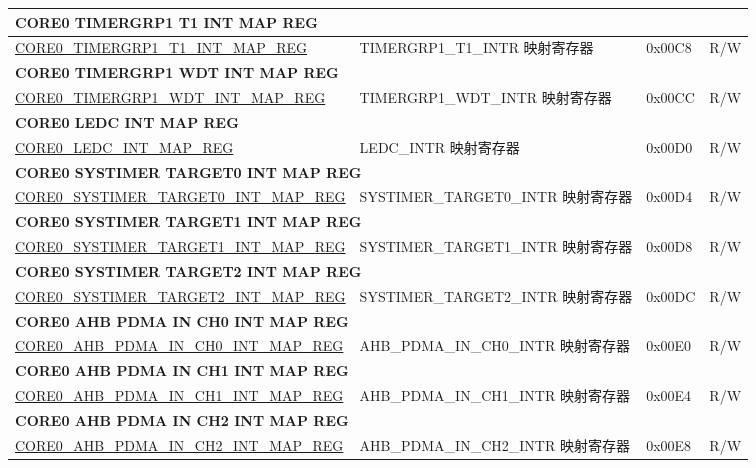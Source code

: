 \begin{longtable}{ | p{8.7cm} | p{6.2cm} | p{1.3cm} | p{1cm} | }
\multicolumn{4}{|l|}{\textbf{CORE0 TIMERGRP1 T1 INT MAP REG}} \\ \hline
\hyperref[regdesc:CORE0TIMERGRP1T1INTMAPREG]{CORE0\_TIMERGRP1\_T1\_INT\_MAP\_REG} & TIMERGRP1\_T1\_INTR 映射寄存器 & 0x00C8 & R/W \\ \hline
\multicolumn{4}{|l|}{\textbf{CORE0 TIMERGRP1 WDT INT MAP REG}} \\ \hline
\hyperref[regdesc:CORE0TIMERGRP1WDTINTMAPREG]{CORE0\_TIMERGRP1\_WDT\_INT\_MAP\_REG} & TIMERGRP1\_WDT\_INTR 映射寄存器 & 0x00CC & R/W \\ \hline
\multicolumn{4}{|l|}{\textbf{CORE0 LEDC INT MAP REG}} \\ \hline
\hyperref[regdesc:CORE0LEDCINTMAPREG]{CORE0\_LEDC\_INT\_MAP\_REG} & LEDC\_INTR 映射寄存器 & 0x00D0 & R/W \\ \hline
\multicolumn{4}{|l|}{\textbf{CORE0 SYSTIMER TARGET0 INT MAP REG}} \\ \hline
\hyperref[regdesc:CORE0SYSTIMERTARGET0INTMAPREG]{CORE0\_SYSTIMER\_TARGET0\_INT\_MAP\_REG} & SYSTIMER\_TARGET0\_INTR 映射寄存器 & 0x00D4 & R/W \\ \hline
\multicolumn{4}{|l|}{\textbf{CORE0 SYSTIMER TARGET1 INT MAP REG}} \\ \hline
\hyperref[regdesc:CORE0SYSTIMERTARGET1INTMAPREG]{CORE0\_SYSTIMER\_TARGET1\_INT\_MAP\_REG} & SYSTIMER\_TARGET1\_INTR 映射寄存器 & 0x00D8 & R/W \\ \hline
\multicolumn{4}{|l|}{\textbf{CORE0 SYSTIMER TARGET2 INT MAP REG}} \\ \hline
\hyperref[regdesc:CORE0SYSTIMERTARGET2INTMAPREG]{CORE0\_SYSTIMER\_TARGET2\_INT\_MAP\_REG} & SYSTIMER\_TARGET2\_INTR 映射寄存器 & 0x00DC & R/W \\ \hline
\multicolumn{4}{|l|}{\textbf{CORE0 AHB PDMA IN CH0 INT MAP REG}} \\ \hline
\hyperref[regdesc:CORE0AHBPDMAINCH0INTMAPREG]{CORE0\_AHB\_PDMA\_IN\_CH0\_INT\_MAP\_REG} & AHB\_PDMA\_IN\_CH0\_INTR 映射寄存器 & 0x00E0 & R/W \\ \hline
\multicolumn{4}{|l|}{\textbf{CORE0 AHB PDMA IN CH1 INT MAP REG}} \\ \hline
\hyperref[regdesc:CORE0AHBPDMAINCH1INTMAPREG]{CORE0\_AHB\_PDMA\_IN\_CH1\_INT\_MAP\_REG} & AHB\_PDMA\_IN\_CH1\_INTR 映射寄存器 & 0x00E4 & R/W \\ \hline
\multicolumn{4}{|l|}{\textbf{CORE0 AHB PDMA IN CH2 INT MAP REG}} \\ \hline
\hyperref[regdesc:CORE0AHBPDMAINCH2INTMAPREG]{CORE0\_AHB\_PDMA\_IN\_CH2\_INT\_MAP\_REG} & AHB\_PDMA\_IN\_CH2\_INTR 映射寄存器 & 0x00E8 & R/W \\ \hline

\end{longtable}
